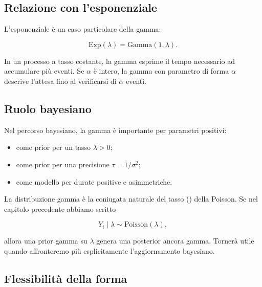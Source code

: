 \documentclass[
  italian,
  letterpaper,
  a4paper,
  11pt,
  open=any]{scrbook}
\providecommand{\tightlist}{%
  \setlength{\itemsep}{0pt}\setlength{\parskip}{0pt}}
\theoremstyle{plain}
\theoremstyle{definition}
\theoremstyle{definition}
\theoremstyle{remark}
\begin{document}
\subsection{Relazione con
l'esponenziale}\label{relazione-con-lesponenziale}

L'esponenziale è un caso particolare della gamma:

\[
\mathrm{Exp}(\lambda) = \mathrm{Gamma}(1,\lambda).
\]

In un processo a tasso costante, la gamma esprime il tempo necessario ad
accumulare più eventi. Se \(\alpha\) è intero, la gamma con parametro di
forma \(\alpha\) descrive l'attesa fino al verificarsi di \(\alpha\)
eventi.

\subsection{Ruolo bayesiano}\label{ruolo-bayesiano}

Nel percorso bayesiano, la gamma è importante per parametri positivi:

\begin{itemize}
\tightlist
\item
  come prior per un tasso \(\lambda > 0\);
\item
  come prior per una precisione \(\tau = 1/\sigma^2\);
\item
  come modello per durate positive e asimmetriche.
\end{itemize}

La distribuzione gamma è la coniugata naturale del tasso (\lambda) della
Poisson. Se nel capitolo precedente abbiamo scritto

\[
Y_i \mid \lambda \sim \mathrm{Poisson}(\lambda),
\]

allora una prior gamma su \(\lambda\) genera una posterior ancora gamma.
Tornerà utile quando affronteremo più esplicitamente l'aggiornamento
bayesiano.

\subsection{Flessibilità della forma}\label{flessibilituxe0-della-forma}
\end{document}
